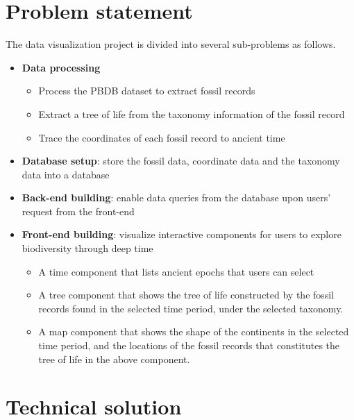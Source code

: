 \documentclass[11pt, a4paper,oneside,chapterprefix=false]{scrbook}
\begin{document}
\chapter{Problem statement} \label{chp:problem_statement}
The data visualization project is divided into several sub-problems as follows.

\begin{itemize}
	\item \textbf{Data processing}
	\begin{itemize}
		\item Process the PBDB dataset to extract fossil records 
		\item Extract a tree of life from the taxonomy information of the fossil record 
		\item Trace the coordinates of each fossil record to ancient time
	\end{itemize} 
	\item \textbf{Database setup}: store the fossil data, coordinate data and the taxonomy data into a database
	\item \textbf{Back-end building}: enable data queries from the database upon users' request from the front-end 
	\item \textbf{Front-end building}: visualize interactive components for users to explore biodiversity through deep time
	\begin{itemize}
		\item A time component that lists ancient epochs that users can select
		\item A tree component that shows the tree of life constructed by the fossil records found in the selected time period, under the selected taxonomy. 
		\item A map component that shows the shape of the continents in the selected time period, and the locations of the fossil records that constitutes the tree of life in the above component.    
	\end{itemize} 
\end{itemize} 

\chapter{Technical solution} \label{chp:technical_solution}
\end{document}
